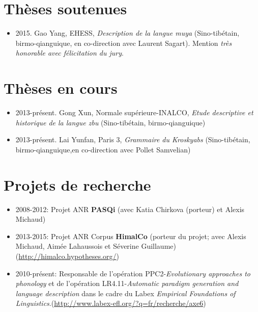\documentclass[oldfontcommands,oneside,a4paper,11pt]{article}
\begin{document}
\section*{Thèses soutenues}
\begin{itemize}
\item 2015. Gao Yang, EHESS, \textit{Description de la langue muya} (Sino-tibétain, birmo-qianguique, en co-direction avec Laurent Sagart). Mention \textit{très honorable avec félicitation du jury}.
\end{itemize}

\section*{Thèses en cours}
\begin{itemize}
\item 2013-présent. Gong Xun, Normale supérieure-INALCO, \textit{Etude descriptive et historique de la langue zbu} (Sino-tibétain, birmo-qianguique)
\item 2013-présent. Lai Yunfan, Paris 3, \textit{Grammaire du Kroskyabs} (Sino-tibétain, birmo-qianguique,en co-direction avec Pollet Samvelian)
\end{itemize}
\section*{Projets de recherche}
\begin{itemize}
\item 2008-2012: Projet ANR \textbf{PASQi} (avec Katia Chirkova (porteur) et Alexis Michaud) 
\item  2013-2015: Projet ANR Corpus \textbf{HimalCo} (porteur du projet; avec Alexis Michaud, Aimée Lahaussois et Séverine Guillaume) (\url{http://himalco.hypotheses.org/})
\item 2010-présent: Responsable de l'opération PPC2-\textit{Evolutionary approaches to phonology} et de l'opération LR4.11-\textit{Automatic paradigm generation and language description} dans le cadre du Labex \textit{Empirical Foundations of Linguistics}.(\url{http://www.labex-efl.org/?q=fr/recherche/axe6})
\end{itemize}
 
     
\end{document}
